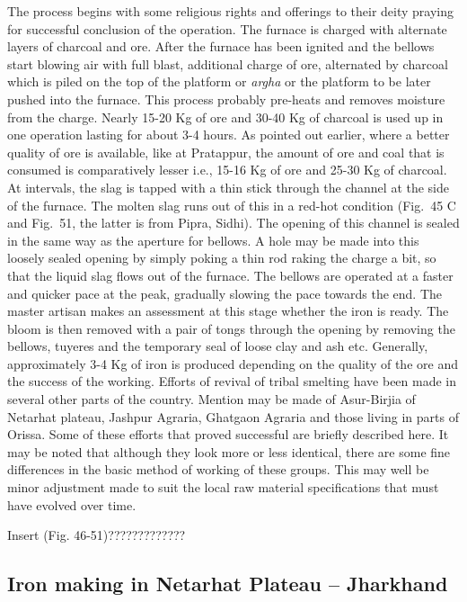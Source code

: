The process begins with some religious rights and offerings to their deity praying for successful conclusion of the operation. The furnace is charged with alternate layers of charcoal and ore. After the furnace has been ignited and the bellows start blowing air with full blast, additional charge of ore, alternated by charcoal which is piled on the top of the platform or {\it argha} or the platform to be later pushed into the furnace. This process probably pre-heats and removes moisture from the charge. Nearly 15-20 Kg of ore and 30-40 Kg of charcoal is used up in one operation lasting for about 3-4 hours. As pointed out earlier, where a better quality of ore is available, like at Pratappur, the amount of ore and coal that is consumed is comparatively lesser i.e., 15-16 Kg of ore and 25-30 Kg of charcoal. At intervals, the slag is tapped with a thin stick through the channel at the side of the furnace. The molten slag runs out of this in a red-hot condition (Fig.~45 C and Fig.~51, the latter is from Pipra, Sidhi). The opening of this channel is sealed in the same way as the aperture for bellows. A hole may be made into this loosely sealed opening by simply poking a thin rod raking the charge a bit, so that the liquid slag flows out of the furnace. The bellows are operated at a faster and quicker pace at the peak, gradually slowing the pace towards the end. The master artisan makes an assessment at this stage whether the iron is ready. The bloom is then removed with a pair of tongs through the opening by removing the bellows, tuyeres and the temporary seal of loose clay and ash etc. Generally, approximately 3-4 Kg of iron is produced depending on the quality of the ore and the success of the working. Efforts of revival of tribal smelting have been made in several other parts of the country. Mention may be made of Asur-Birjia of Netarhat plateau, Jashpur Agraria, Ghatgaon Agraria and those living in parts of Orissa. Some of these efforts that proved successful are briefly described here. It may be noted that although they look more or less identical, there are some fine differences in the basic method of working of these groups. This may well be minor adjustment made to suit the local raw material specifications that must have evolved over time.

Insert (Fig. 46-51)?????????????

\vspace{-.4cm}

\subsection*{Iron making in Netarhat Plateau – Jharkhand}\label{chapter7-subsection-7.1b}

